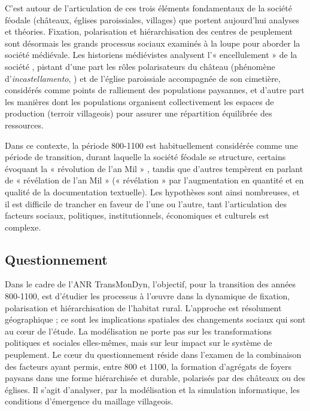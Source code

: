{	C'est autour de l'articulation de ces trois éléments fondamentaux de la société féodale (châteaux, églises paroissiales, villages) que portent aujourd'hui analyses et théories.
	Fixation, polarisation et hiérarchisation des centres de peuplement sont désormais les grands processus sociaux examinés à la loupe pour aborder la société médiévale.
	Les historiens médiévistes analysent l'« encellulement » de la société \autocite{fossier_enfance_1982}, pistant d'une part les rôles polarisateurs du château (phénomène d'\textit{incastellamento},  \cite{toubert_les_1973}) et de l'église paroissiale accompagnée de son cimetière, considérés comme points de ralliement des populations paysannes, et d'autre part les manières dont les populations organisent collectivement les espaces de production (terroir villageois) pour assurer une répartition équilibrée des ressources.
	
	Dans ce contexte, la période 800-1100 est habituellement considérée comme une période de transition, durant laquelle la société féodale se structure, certains évoquant la « révolution de l'an Mil » \autocite{fossier_enfance_1982}, tandis que d'autres tempèrent en parlant de « révélation de l'an Mil » \autocite{barthelemy_societe_1993} (« révélation » par l'augmentation en quantité et en qualité de la documentation textuelle).
	Les hypothèses sont ainsi nombreuses, et il est difficile de trancher en faveur de l'une ou l'autre, tant l'articulation des facteurs sociaux, politiques, institutionnels, économiques et culturels est complexe.
}

\subsection{Questionnement}

{\redroman
	Dans le cadre de l'ANR TransMonDyn, l'objectif, pour la transition des années 800-1100, est d'étudier les processus à l'œuvre dans la dynamique de fixation, polarisation et hiérarchisation de l'habitat rural.
	L'approche est résolument géographique ; ce sont les implications spatiales des changements sociaux qui sont au cœur de l'étude.
	La modélisation ne porte pas sur les transformations politiques et sociales elles-mêmes, mais sur leur impact sur le système de peuplement.
	Le cœur du questionnement réside dans l'examen de la combinaison des facteurs ayant permis, entre 800 et 1100, la formation d'agrégats de foyers paysans dans une forme hiérarchisée et durable, polarisés par des châteaux ou des églises.
	Il s'agit d'analyser, par la modélisation et la simulation informatique, les conditions d'émergence du maillage villageois.
}

